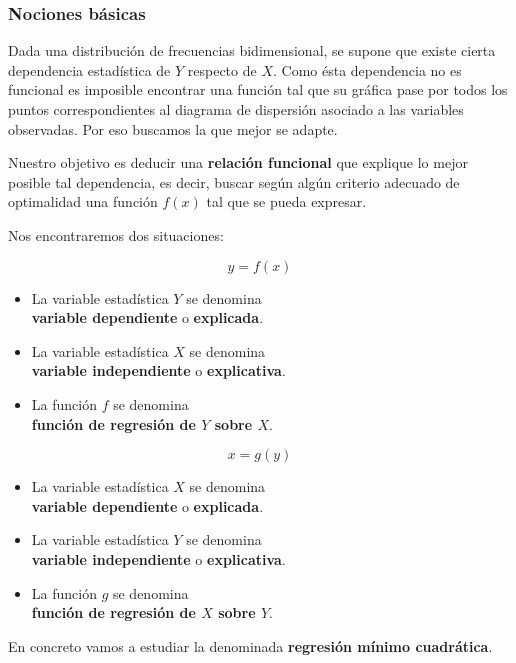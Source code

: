 \documentclass[10pt, a4paper]{article}
\theoremstyle{theorem-style}
\theoremstyle{definition-style}
\theoremstyle{remark-style}
\theoremstyle{example-style}
\theoremstyle{definition-style}
\theoremstyle{remark-style}
\begin{document}
	 \subsubsection{Nociones básicas}

	 Dada una distribución de frecuencias bidimensional, se supone que existe
	 cierta dependencia estadística de $Y$ respecto de $X$. Como ésta dependencia no
	 es funcional es imposible encontrar una función tal que su gráfica pase por
	 todos los puntos correspondientes al diagrama de dispersión asociado a las
	 variables observadas. Por eso buscamos la que mejor se adapte.

	  Nuestro objetivo es deducir una \textbf{relación funcional} que explique lo mejor
	  posible tal dependencia, es decir, buscar según algún criterio adecuado de
	  optimalidad una función $f(x)$ tal que se pueda expresar.
	  
\pagebreak
Nos encontraremos dos situaciones:
\begin{multicols}{2}
$$ y = f(x) $$
\begin{itemize}
	\item La variable estadística $Y$ se denomina\\ \textbf{variable dependiente} o \textbf{explicada}.
	\item La variable estadística $X$ se denomina\\ \textbf{variable independiente} o \textbf{explicativa}.
	\item La función $f$ se denomina\\ \textbf{función de regresión de $Y$ sobre $X$}.
\end{itemize}

	$$ x = g(y) $$
	\begin{itemize}
	\item La variable estadística $X$ se denomina\\ \textbf{variable dependiente} o \textbf{explicada}.
	\item La variable estadística $Y$ se denomina\\ \textbf{variable independiente} o \textbf{explicativa}.
	\item La función $g$ se denomina\\ \textbf{función de regresión de $X$ sobre $Y$}.
\end{itemize}
\end{multicols}

\vspace{2mm}
	En concreto vamos a estudiar la denominada \textbf{regresión mínimo
	cuadrática}.
\end{document}
